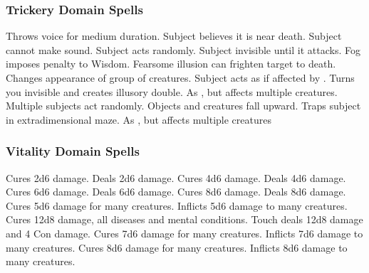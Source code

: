 \subsubsection{Trickery Domain Spells}

\begin{spelllist}
  \spellhead[1]{}
   Throws voice for medium duration.
   Subject believes it is near death.
   Subject cannot make sound.
   Subject acts randomly.
   Subject invisible until it attacks.
   Fog imposes  penalty to Wisdom.
   Fearsome illusion can frighten target to death.
   Changes appearance of group of creatures.
   Subject acts as if affected by .
   Turns you invisible and creates illusory double.
  \spellhead[6]{}
   As , but affects multiple creatures.
   Multiple subjects act randomly.
  \spellhead[8]{}
   Objects and creatures fall upward.
   Traps subject in extradimensional maze.
   As , but affects multiple creatures
\end{spelllist}

\subsubsection{Vitality Domain Spells}

\begin{spelllist}
   Cures 2d6 damage.
   Deals 2d6 damage.
   Cures 4d6 damage.
   Deals 4d6 damage.
   Cures 6d6 damage.
   Deals 6d6 damage.
   Cures 8d6 damage.
   Deals 8d6 damage.
   Cures 5d6 damage for many creatures.
   Inflicts 5d6 damage to many creatures.
   Cures 12d8 damage, all diseases and mental conditions.
   Touch deals 12d8 damage and 4 Con damage.
   Cures 7d6 damage for many creatures.
   Inflicts 7d6 damage to many creatures.
   Cures 8d6 damage for many creatures.
   Inflicts 8d6 damage to many creatures.
  \spellhead[9]{}
  \spellhead[9]{}
\end{spelllist}

